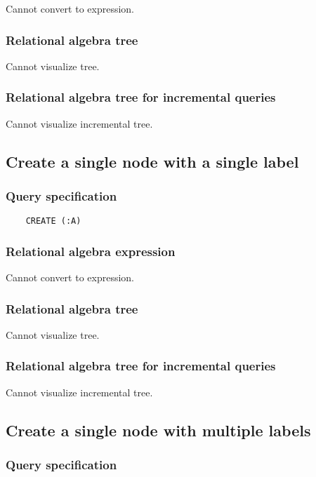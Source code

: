 	Cannot convert to expression.

	\subsubsection*{Relational algebra tree}

	Cannot visualize tree.

	\subsubsection*{Relational algebra tree for incremental queries}

	Cannot visualize incremental tree.
	\subsection{Create a single node with a single label}

	\subsubsection*{Query specification}

	\begin{lstlisting}
	CREATE (:A)
	\end{lstlisting}


	\subsubsection*{Relational algebra expression}

	Cannot convert to expression.

	\subsubsection*{Relational algebra tree}

	Cannot visualize tree.

	\subsubsection*{Relational algebra tree for incremental queries}

	Cannot visualize incremental tree.
	\subsection{Create a single node with multiple labels}

	\subsubsection*{Query specification}

